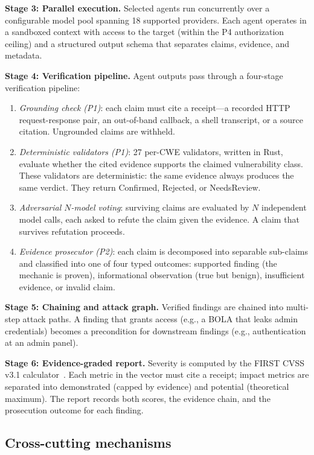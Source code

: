 \documentclass[conference]{IEEEtran}
\begin{document}
\textbf{Stage 3: Parallel execution.} Selected agents run concurrently over a configurable model pool spanning 18 supported providers. Each agent operates in a sandboxed context with access to the target (within the P4 authorization ceiling) and a structured output schema that separates claims, evidence, and metadata.

\textbf{Stage 4: Verification pipeline.} Agent outputs pass through a four-stage verification pipeline:
\begin{enumerate}
\item \emph{Grounding check (P1)}: each claim must cite a receipt---a recorded HTTP request-response pair, an out-of-band callback, a shell transcript, or a source citation. Ungrounded claims are withheld.
\item \emph{Deterministic validators (P1)}: 27 per-CWE validators, written in Rust, evaluate whether the cited evidence supports the claimed vulnerability class. These validators are deterministic: the same evidence always produces the same verdict. They return Confirmed, Rejected, or NeedsReview.
\item \emph{Adversarial $N$-model voting}: surviving claims are evaluated by $N$ independent model calls, each asked to refute the claim given the evidence. A claim that survives refutation proceeds.
\item \emph{Evidence prosecutor (P2)}: each claim is decomposed into separable sub-claims and classified into one of four typed outcomes: supported finding (the mechanic is proven), informational observation (true but benign), insufficient evidence, or invalid claim.
\end{enumerate}

\textbf{Stage 5: Chaining and attack graph.} Verified findings are chained into multi-step attack paths. A finding that grants access (e.g., a BOLA that leaks admin credentials) becomes a precondition for downstream findings (e.g., authentication at an admin panel).

\textbf{Stage 6: Evidence-graded report.} Severity is computed by the FIRST CVSS v3.1 calculator~\cite{first2019cvss}. Each metric in the vector must cite a receipt; impact metrics are separated into demonstrated (capped by evidence) and potential (theoretical maximum). The report records both scores, the evidence chain, and the prosecution outcome for each finding.

\subsection{Cross-cutting mechanisms}
\end{document}
